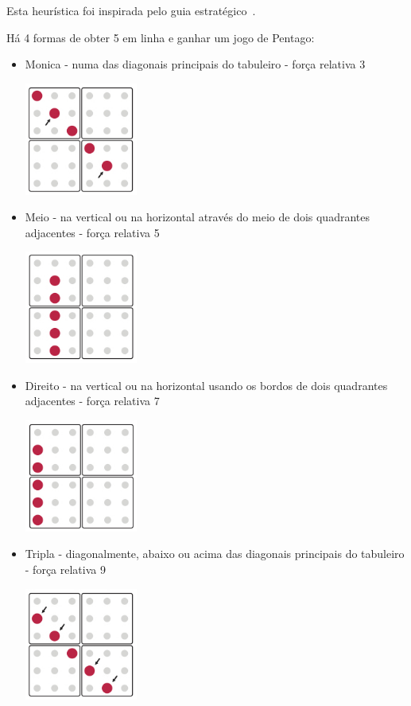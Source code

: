 
Esta heurística foi inspirada pelo guia estratégico~\cite{pentstrat}.

Há 4 formas de obter 5 em linha e ganhar um jogo de Pentago:
\begin{itemize}
	\item Monica - numa das diagonais principais do tabuleiro - força relativa 3
\begin{table}[H]
\centering
\includegraphics[height=3.7cm]{images/monica.jpg}
\end{table}
	\item Meio - na vertical ou na horizontal através do meio de dois quadrantes adjacentes - força relativa 5
\begin{table}[H]
\centering
\includegraphics[height=3.7cm]{images/middle.jpg}
\end{table}
	\item Direito - na vertical ou na horizontal usando os bordos de dois quadrantes adjacentes - força relativa 7
\begin{table}[H]
\centering
\includegraphics[height=3.7cm]{images/straight.jpg}
\end{table}
	\item Tripla - diagonalmente, abaixo ou acima das diagonais principais do tabuleiro - força relativa 9
\begin{table}[H]
\centering
\includegraphics[height=3.7cm]{images/triple.jpg}
\end{table}
\end{itemize}

